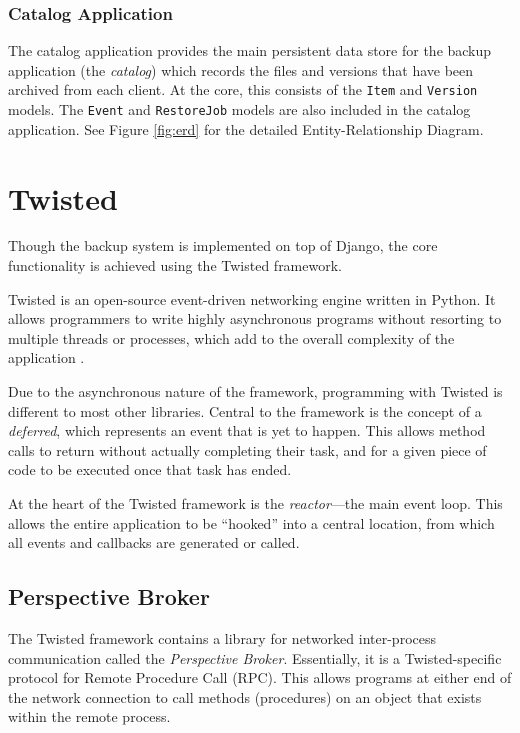 \subsubsection{Catalog Application}

The catalog application provides the main persistent data store for the backup
application (the \emph{catalog}) which records the files and versions that have
been archived from each client. At the core, this consists of the \verb!Item!
and \verb!Version! models. The \verb!Event! and \verb!RestoreJob! models are
also included in the catalog application. See Figure \ref{fig:erd} for the
detailed Entity-Relationship Diagram.

\section{Twisted}

Though the backup system is implemented on top of Django, the core
functionality is achieved using the Twisted framework.

Twisted is an open-source event-driven networking engine written in Python. It
allows programmers to write highly asynchronous programs without resorting to
multiple threads or processes, which add to the overall complexity of the
application \cite{kinder2005}.

Due to the asynchronous nature of the framework, programming with Twisted is
different to most other libraries. Central to the framework is the concept of
a \emph{deferred}, which represents an event that is yet to happen. This allows
method calls to return without actually completing their task, and for a given
piece of code to be executed once that task has ended.

At the heart of the Twisted framework is the \emph{reactor}---the main event
loop. This allows the entire application to be ``hooked'' into a central
location, from which all events and callbacks are generated or called.

\subsection{Perspective Broker}

The Twisted framework contains a library for networked inter-process
communication called the \emph{Perspective Broker}. Essentially, it is
a Twisted-specific protocol for Remote Procedure Call (RPC). This allows
programs at either end of the network connection to call methods (procedures)
on an object that exists within the remote process.

